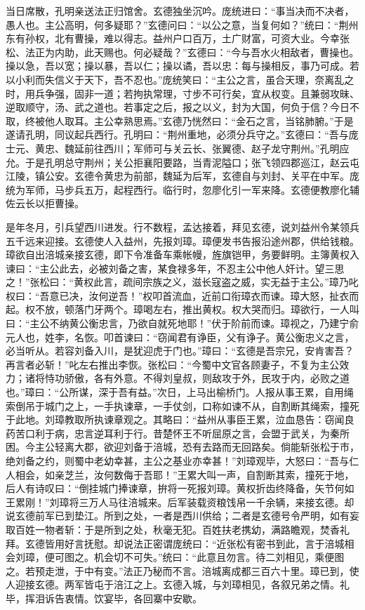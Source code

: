 当日席散，孔明亲送法正归馆舍。玄德独坐沉吟。庞统进曰：“事当决而不决者，愚人也。主公高明，何多疑耶？”玄德问曰：“以公之意，当复何如？”统曰：“荆州东有孙权，北有曹操，难以得志。益州户口百万，土广财富，可资大业。今幸张松、法正为内助，此天赐也。何必疑哉？”玄德曰：“今与吾水火相敌者，曹操也。操以急，吾以宽；操以暴，吾以仁；操以谲，吾以忠：每与操相反，事乃可成。若以小利而失信义于天下，吾不忍也。”庞统笑曰：“主公之言，虽合天理，奈离乱之时，用兵争强，固非一道；若拘执常理，寸步不可行矣，宜从权变。且兼弱攻昧、逆取顺守，汤、武之道也。若事定之后，报之以义，封为大国，何负于信？今日不取，终被他人取耳。主公幸熟思焉。”玄德乃恍然曰：“金石之言，当铭肺腑。”于是遂请孔明，同议起兵西行。孔明曰：“荆州重地，必须分兵守之。”玄德曰：“吾与庞士元、黄忠、魏延前往西川；军师可与关云长、张翼德、赵子龙守荆州。”孔明应允。于是孔明总守荆州；关公拒襄阳要路，当青泥隘口；张飞领四郡巡江，赵云屯江陵，镇公安。玄德令黄忠为前部，魏延为后军，玄德自与刘封、关平在中军。庞统为军师，马步兵五万，起程西行。临行时，忽廖化引一军来降。玄德便教廖化辅佐云长以拒曹操。

是年冬月，引兵望西川进发。行不数程，孟达接着，拜见玄德，说刘益州令某领兵五千远来迎接。玄德使人入益州，先报刘璋。璋便发书告报沿途州郡，供给钱粮。璋欲自出涪城亲接玄德，即下令准备车乘帐幔，旌旗铠甲，务要鲜明。主簿黄权入谏曰：“主公此去，必被刘备之害，某食禄多年，不忍主公中他人奸计。望三思之！”张松曰：“黄权此言，疏间宗族之义，滋长寇盗之威，实无益于主公。”璋乃叱权曰：“吾意已决，汝何逆吾！”权叩首流血，近前口衔璋衣而谏。璋大怒，扯衣而起。权不放，顿落门牙两个。璋喝左右，推出黄权。权大哭而归。璋欲行，一人叫曰：“主公不纳黄公衡忠言，乃欲自就死地耶！”伏于阶前而谏。璋视之，乃建宁俞元人也，姓李，名恢。叩首谏曰：“窃闻君有诤臣，父有诤子。黄公衡忠义之言，必当听从。若容刘备入川，是犹迎虎于门也。”璋曰：“玄德是吾宗兄，安肯害吾？再言者必斩！”叱左右推出李恢。张松曰：“今蜀中文官各顾妻子，不复为主公效力；诸将恃功骄傲，各有外意。不得刘皇叔，则敌攻于外，民攻于内，必败之道也。”璋曰：“公所谋，深于吾有益。”次日，上马出榆桥门。人报从事王累，自用绳索倒吊于城门之上，一手执谏章，一手仗剑，口称如谏不从，自割断其绳索，撞死于此地。刘璋教取所执谏章观之。其略曰：“益州从事臣王累，泣血恳告：窃闻良药苦口利于病，忠言逆耳利于行。昔楚怀王不听屈原之言，会盟于武关，为秦所困。今主公轻离大郡，欲迎刘备于涪城，恐有去路而无回路矣。倘能斩张松于市，绝刘备之约，则蜀中老幼幸甚，主公之基业亦幸甚！”刘璋观毕，大怒曰：“吾与仁人相会，如亲芝兰，汝何数侮于吾耶！”王累大叫一声，自割断其索，撞死于地，后人有诗叹曰：“倒挂城门捧谏章，拚将一死报刘璋。黄权折齿终降备，矢节何如王累刚！”刘璋将三万人马往涪城来。后军装载资粮饯帛一千余辆，来接玄德。却说玄德前军已到垫江。所到之处，一者是西川供给；二者是玄德号令严明，如有妄取百姓一物者斩：于是所到之处，秋毫无犯。百姓扶老携幼，满路瞻观，焚香礼拜。玄德皆用好言抚慰。却说法正密谓庞统曰：“近张松有密书到此，言于涪城相会刘璋，便可图之。机会切不可失。”统曰：“此意且勿言。待二刘相见，乘便图之。若预走泄，于中有变。”法正乃秘而不言。涪城离成都三百六十里。璋已到，使人迎接玄德。两军皆屯于涪江之上。玄德入城，与刘璋相见，各叙兄弟之情。礼毕，挥泪诉告衷情。饮宴毕，各回寨中安歇。

